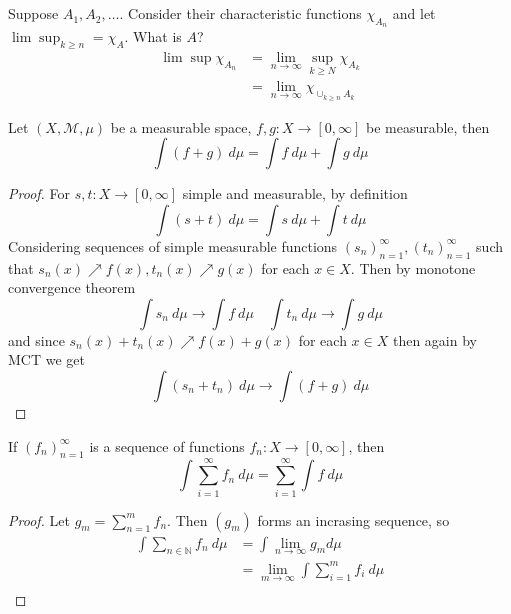 
\chapter{}

\begin{remark}
  Suppose $ A_1 ,  A_2 , \ldots$. Consider their characteristic functions $\chi_{A_n}$ and let $\lim \sup_{k \ge n} = \chi_A$. What is $A$? \begin{align*}
    \lim \sup \chi_{A_n} &= \lim_{ n \to \infty} \sup_{k \ge N } \chi_{A_k} \\ 
    & = \lim_{n \to \infty} \chi_{\cup_{k \ge n } A_k}
  \end{align*}
\end{remark}

\begin{theorem}
  Let $(X,  \mathcal{M}, \mu)$ be a measurable space, $f, g : X \to [0, \infty]$ be measurable, then \[
    \int (f+g) \ d \mu = \int f \ d \mu + \int g \ d \mu
  \]
\end{theorem}
\begin{proof}
  For $s, t: X \to [0, \infty]$ simple and measurable, by definition \[
    \int (s+t) \ d \mu = \int s \ d \mu + \int t \ d \mu
  \]
   Considering sequences of simple measurable functions $(s_n)_{ n=1}^\infty, (t_n)_{n=1}^\infty$ such that $s_n(x) \nearrow f(x), t_n(x) \nearrow g(x)$ for each $x \in X$. Then by monotone convergence theorem \[
        \int s_n \ d \mu \to \int f \ d \mu  \quad \int t_n \ d \mu \to \int g \ d \mu
   \]
  and since $s_n(x)+t_n(x) \nearrow f(x) + g(x)$ for each $x \in X$ then again by MCT we get \[
    \int (s_n + t_n) \ d \mu \to \int (f+g) \ d \mu
  \]
\end{proof}
\begin{corollary}
  If $(f_n)_{ n=1}^\infty$ is a sequence of functions $f_n: X \to [0, \infty]$, then \[
        \int \sum_{i = 1}^{\infty}  f_n \ d \mu = \sum_{i = 1}^{\infty}  \int f \ d \mu
  \]
\end{corollary}
\begin{proof}
  Let $g_m = \sum_{n = 1}^{m} f_n$. Then $(g_m)$ forms an incrasing sequence, so \begin{align*}
    \int \sum_{n \in \mathbb{N}} f_n \ d \mu  &= \int \lim_{n \to \infty} g_m d \mu \\ 
    & = \lim_{m \to \infty} \int \sum_{i = 1}^{m} f_i \ d \mu \\ 
    \end{align*}
\end{proof}

